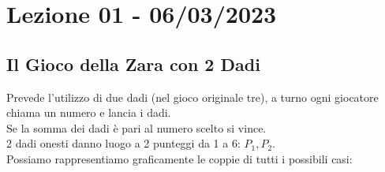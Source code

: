 \section{Lezione 01 - 06/03/2023}

\subsection{Il Gioco della Zara con 2 Dadi}
Prevede l'utilizzo di due dadi (nel gioco originale tre), a turno ogni giocatore chiama un numero e lancia i dadi.\\
Se la somma dei dadi è pari al numero scelto si vince.\\
2 dadi onesti danno luogo a 2 punteggi da 1 a 6: $P_1, P_2$.\\
Possiamo rappresentiamo graficamente le coppie di tutti i possibili casi:

